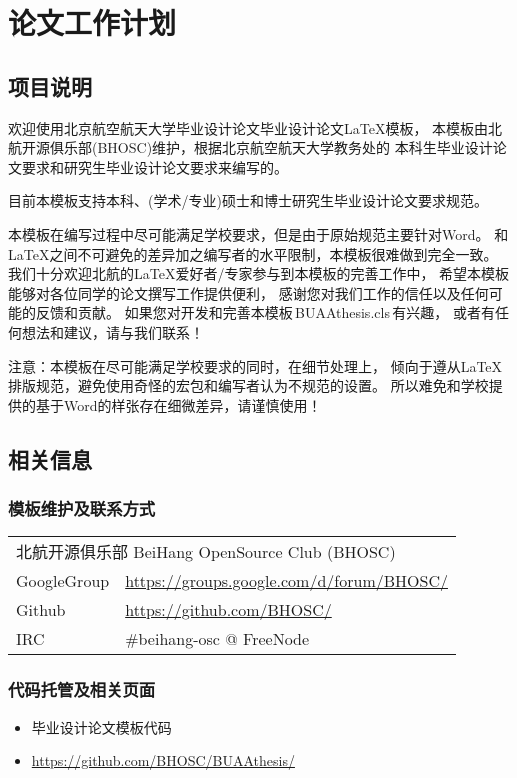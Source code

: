 
\chapter{论文工作计划}

\section{项目说明}

欢迎使用北京航空航天大学毕业设计论文毕业设计论文\LaTeX{}模板，
本模板由北航开源俱乐部(BHOSC)维护，根据北京航空航天大学教务处的
本科生毕业设计论文要求和研究生毕业设计论文要求来编写的。

目前本模板支持本科、(学术/专业)硕士和博士研究生毕业设计论文要求规范。

本模板在编写过程中尽可能满足学校要求，但是由于原始规范主要针对Word。
和\LaTeX{}之间不可避免的差异加之编写者的水平限制，本模板很难做到完全一致。
我们十分欢迎北航的\LaTeX{}爱好者/专家参与到本模板的完善工作中，
希望本模板能够对各位同学的论文撰写工作提供便利，
感谢您对我们工作的信任以及任何可能的反馈和贡献。
如果您对开发和完善本模板\,BUAAthesis.cls\,有兴趣，
或者有任何想法和建议，请与我们联系！

{\heiti 注意：}本模板在尽可能满足学校要求的同时，在细节处理上，
倾向于遵从\LaTeX{}排版规范，避免使用奇怪的宏包和编写者认为不规范的设置。
所以难免和学校提供的基于Word的样张存在细微差异，请谨慎使用！

\section{相关信息}

\subsection{模板维护及联系方式}
\begin{tabular}{ll}
    \multicolumn{2}{l}{北航开源俱乐部 BeiHang OpenSource Club (BHOSC)} \\
    GoogleGroup & \url{https://groups.google.com/d/forum/BHOSC/} \\
    Github      & \url{https://github.com/BHOSC/} \\
    IRC         & \#beihang-osc @ FreeNode
\end{tabular}

\subsection{代码托管及相关页面}
\begin{itemize}
    \item 毕业设计论文模板代码
    \item[] \url{https://github.com/BHOSC/BUAAthesis/}
\end{itemize}

